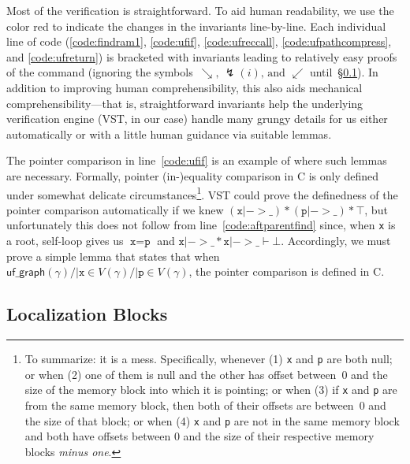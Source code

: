 \documentclass[acmsmall,review,anonymous]{acmart}\settopmatter{printfolios=true,printccs=false,printacmref=false}
\newcommand{\p}[1]{\ensuremath{\mathsf{#1}}} \newcommand{\m}[1]{\ensuremath{\mathit{#1}}} \newcommand{\ma}[1]{\ensuremath{\mathcal{#1}}} \let\ramify\lightning
\begin{document}
Most of the verification is straightforward.  To aid human readability, we use the color {\color{red}red} to indicate the changes in the invariants line-by-line.
Each individual line of code
(\ref{code:findram1}, \ref{code:ufif}, \ref{code:ufreccall}, \ref{code:ufpathcompress},
and \ref{code:ufreturn}) is bracketed with invariants leading to relatively easy proofs
of the command (ignoring the symbols~$\searrow \text{, } \ramify(i) \text{, and }
\swarrow$ until~\S\ref{sec:localblocks}).
In addition to improving human comprehensibility, this
also aids mechanical comprehensibility---that is, straightforward
invariants help the underlying verification engine (VST, in our case) handle many grungy
details for us either automatically or with a little human guidance via suitable lemmas.

The pointer comparison in line~\ref{code:ufif} is an example of where
such lemmas are necessary.
Formally, pointer (in-)equality comparison in C is only defined under somewhat delicate
circumstances\footnote{\label{footnote:pointereq}To summarize: it is a mess. Specifically,
whenever (1) \texttt{x} and \texttt{p} are both null; or when (2) one of them is null and the
other has offset between~0 and the size of the memory block into which it is pointing;
or when (3) if \texttt{x} and \texttt{p} are from the same memory block, then both of their
offsets are between~0 and the size of that block; or when (4) \texttt{x} and \texttt{p} are
not in the same memory block and both have offsets between 0 and the size of their
respective memory blocks \emph{minus one}.}.  VST could prove the definedness of the
pointer comparison automatically if we knew
\mbox{$(\texttt{x} |-> \_) * (\texttt{p} |-> \_) * \top$}, but
unfortunately this does not follow from line~\ref{code:aftparentfind} since,
when \texttt{x} is a root, self-loop gives us $\texttt{x}=\texttt{p}$ and
$\texttt{x} |-> \_ * \texttt{x} |-> \_ \vdash \bot$.  Accordingly, we must prove a
simple lemma that states that when $\p{uf\_graph}(\gamma) /| \texttt{x}
\in V(\gamma) /| \texttt{p} \in V(\gamma)$,
the pointer comparison is defined in C.

\subsection{Localization Blocks}
\label{sec:localblocks}
\end{document}
